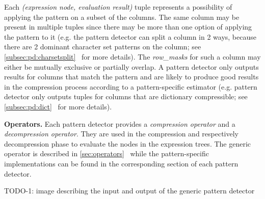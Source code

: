 Each \textit{(expression node, evaluation result)} tuple represents a possibility of applying the pattern on a subset of the columns. The same column may be present in multiple tuples since there may be more than one option of applying the pattern to it (e.g. the  pattern detector can split a column in 2 ways, because there are 2 dominant character set patterns on the column; see \ref{subsec:pd:charsetsplit}~ for more details). The \textit{row\_masks} for such a column may either be mutually exclusive or partially overlap. A pattern detector only outputs results for columns that match the pattern and are likely to produce good results in the compression process according to a pattern-specific estimator (e.g.  pattern detector only outputs tuples for columns that are dictionary compressible; see \ref{subsec:pd:dict}~ for more details).

\textbf{Operators.} Each pattern detector provides a \textit{compression operator} and a \textit{decompression operator}. They are used in the compression and respectively decompression phase to evaluate the nodes in the expression trees. The generic operator is described in \ref{sec:operators}~ while the pattern-specific implementations can be found in the corresponding section of each pattern detector.

TODO-1: image describing the input and output of the generic pattern detector

